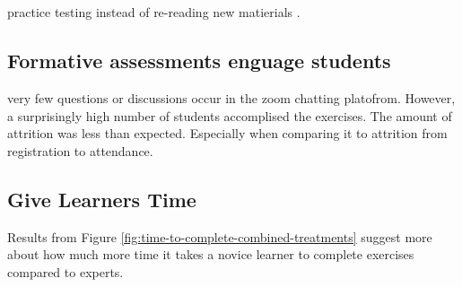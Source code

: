 \documentclass[040-assessment.tex]{subfiles}
\begin{document}
\subsection{}

    practice testing instead of re-reading new matierials
    \cite{dunloskyImprovingStudentsLearning2013}.

\subsection{Formative assessments enguage students}

    very few questions or discussions occur in the zoom chatting platofrom.
    However, a surprisingly high number of students accomplised the exercises.
    The amount of attrition was less than expected.
    Especially when comparing it to attrition from registration to attendance.

\subsection{Give Learners Time}

    Results from Figure \ref{fig:time-to-complete-combined-treatments} suggest more about
    how much more time it takes a novice learner to complete exercises compared to experts.
\end{document}
